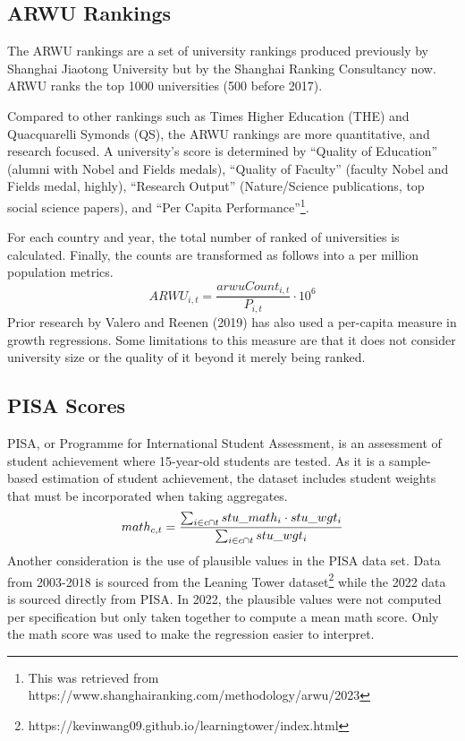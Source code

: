 \documentclass[11pt]{article}
\begin{document}
\subsection{ARWU Rankings}
The ARWU rankings are a set of university rankings produced previously by Shanghai Jiaotong University but by the Shanghai Ranking Consultancy now. ARWU ranks the top 1000 universities (500 before 2017).

Compared to other rankings such as Times Higher Education (THE) and Quacquarelli Symonds (QS), the ARWU rankings are more quantitative, and research focused. A university's score is determined by ``Quality of Education'' (alumni with Nobel and Fields medals), ``Quality of Faculty'' (faculty Nobel and Fields medal, highly), ``Research Output'' (Nature/Science publications, top social science papers), and ``Per Capita Performance''\footnote{This was retrieved from https://www.shanghairanking.com/methodology/arwu/2023}.

For each country and year, the total number of ranked of universities is calculated. Finally, the counts are transformed as follows into a per million population metrics.
\begin{equation}
    ARWU_{i,t} = \frac{arwuCount_{i,t}}{P_{i,t}} \cdot 10^6
\end{equation}
Prior research by Valero and Reenen (2019) has also used a per-capita measure in growth regressions. Some limitations to this measure are that it does not consider university size or the quality of it beyond it merely being ranked.
\subsection{PISA Scores}
PISA, or Programme for International Student Assessment, is an assessment of student achievement where 15-year-old students are tested. As it is a sample-based estimation of student achievement, the dataset includes student weights that must be incorporated when taking aggregates.
\begin{equation}
    math_{c, t} = \frac{\sum_{i \in c \cap t} stu\_math_i \cdot stu\_wgt_i}{\sum_{i \in c \cap t} stu\_wgt_i} \\
\end{equation}
Another consideration is the use of plausible values in the PISA data set. Data from 2003-2018 is sourced from the Leaning Tower dataset\footnote{https://kevinwang09.github.io/learningtower/index.html} while the 2022 data is sourced directly from PISA. In 2022, the plausible values were not computed per specification but only taken together to compute a mean math score. Only the math score was used to make the regression easier to interpret.
\end{document}
